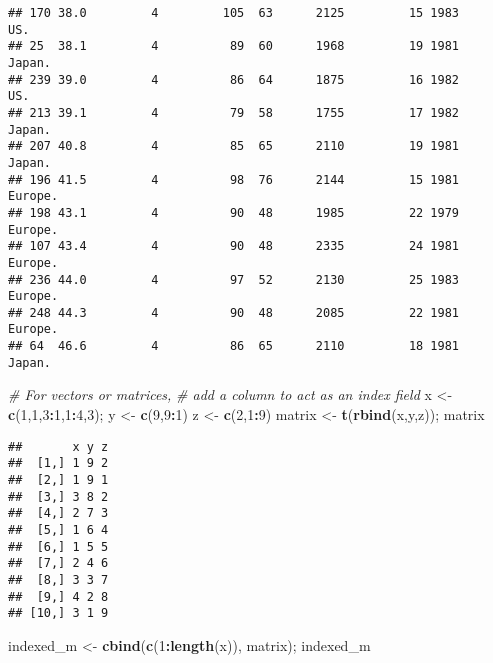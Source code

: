 \documentclass[11pt,]{article}
\newenvironment{Shaded}{\begin{snugshade}}{\end{snugshade}}
\newcommand{\CommentTok}[1]{\textcolor[rgb]{0.56,0.35,0.01}{\textit{#1}}}
\newcommand{\DecValTok}[1]{\textcolor[rgb]{0.00,0.00,0.81}{#1}}
\newcommand{\KeywordTok}[1]{\textcolor[rgb]{0.13,0.29,0.53}{\textbf{#1}}}
\newcommand{\NormalTok}[1]{#1}
\newcommand{\OperatorTok}[1]{\textcolor[rgb]{0.81,0.36,0.00}{\textbf{#1}}}
\newcommand{\StringTok}[1]{\textcolor[rgb]{0.31,0.60,0.02}{#1}}
\begin{document}
\begin{verbatim}
## 170 38.0         4         105  63      2125         15 1983      US.
## 25  38.1         4          89  60      1968         19 1981   Japan.
## 239 39.0         4          86  64      1875         16 1982      US.
## 213 39.1         4          79  58      1755         17 1982   Japan.
## 207 40.8         4          85  65      2110         19 1981   Japan.
## 196 41.5         4          98  76      2144         15 1981  Europe.
## 198 43.1         4          90  48      1985         22 1979  Europe.
## 107 43.4         4          90  48      2335         24 1981  Europe.
## 236 44.0         4          97  52      2130         25 1983  Europe.
## 248 44.3         4          90  48      2085         22 1981  Europe.
## 64  46.6         4          86  65      2110         18 1981   Japan.
\end{verbatim}

\begin{Shaded}
\begin{Highlighting}[]
  \CommentTok{# For vectors or matrices,}
  \CommentTok{# add a column to act as an index field}
\NormalTok{  x <-}\StringTok{ }\KeywordTok{c}\NormalTok{(}\DecValTok{1}\NormalTok{,}\DecValTok{1}\NormalTok{,}\DecValTok{3}\OperatorTok{:}\DecValTok{1}\NormalTok{,}\DecValTok{1}\OperatorTok{:}\DecValTok{4}\NormalTok{,}\DecValTok{3}\NormalTok{); y <-}\StringTok{ }\KeywordTok{c}\NormalTok{(}\DecValTok{9}\NormalTok{,}\DecValTok{9}\OperatorTok{:}\DecValTok{1}\NormalTok{)}
\NormalTok{  z <-}\StringTok{ }\KeywordTok{c}\NormalTok{(}\DecValTok{2}\NormalTok{,}\DecValTok{1}\OperatorTok{:}\DecValTok{9}\NormalTok{)}
\NormalTok{  matrix <-}\StringTok{ }\KeywordTok{t}\NormalTok{(}\KeywordTok{rbind}\NormalTok{(x,y,z)); matrix}
\end{Highlighting}
\end{Shaded}

\begin{verbatim}
##       x y z
##  [1,] 1 9 2
##  [2,] 1 9 1
##  [3,] 3 8 2
##  [4,] 2 7 3
##  [5,] 1 6 4
##  [6,] 1 5 5
##  [7,] 2 4 6
##  [8,] 3 3 7
##  [9,] 4 2 8
## [10,] 3 1 9
\end{verbatim}

\begin{Shaded}
\begin{Highlighting}[]
\NormalTok{  indexed_m <-}\StringTok{ }\KeywordTok{cbind}\NormalTok{(}\KeywordTok{c}\NormalTok{(}\DecValTok{1}\OperatorTok{:}\KeywordTok{length}\NormalTok{(x)), matrix); indexed_m}
\end{Highlighting}
\end{Shaded}
\end{document}
